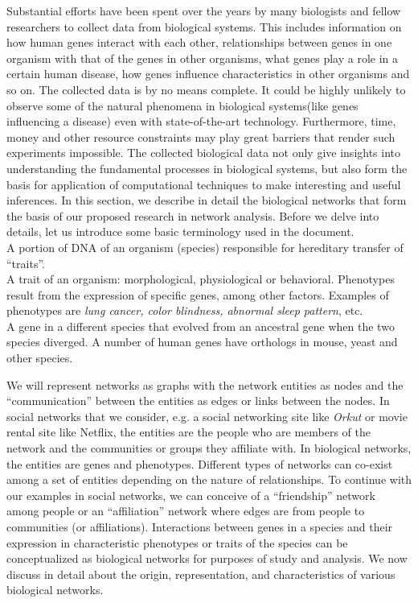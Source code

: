 Substantial efforts have been spent over the years by many biologists and fellow researchers to collect data from biological systems. This includes information on how human genes interact with each other, relationships between genes in one organism with that of the genes in other organisms, what genes play a role in a certain human disease, how genes influence characteristics in other organisms and so on. The collected data is by no means complete. It could be highly unlikely to observe some of the natural phenomena in biological systems(like genes influencing a disease) even with state-of-the-art technology. Furthermore, time, money and other resource constraints may play great barriers that render such experiments impossible. The collected biological data not only give insights into understanding the fundamental processes in biological systems, but also form the basis for application of computational techniques to make interesting and useful inferences. In this section, we describe in detail the biological networks that form the basis of our proposed research in network analysis. Before we delve into details, let us introduce some basic terminology used in the document.\\
 A portion of DNA of an organism (species) responsible for hereditary transfer of ``traits''.\\
 A trait of an organism: morphological, physiological or behavioral. Phenotypes result from the expression of specific genes, among other factors. Examples of phenotypes are \emph{lung cancer, color blindness, abnormal sleep pattern}, etc.\\
 A gene in a different species that evolved from an ancestral gene when the two species diverged.  A number of human genes have orthologs in mouse, yeast and other species.

We will represent networks as graphs with the network entities as nodes and the ``communication'' between the entities as edges or links between the nodes. In social networks that we consider, e.g. a social networking site like \emph{Orkut} or movie rental site like Netflix, the entities are the people who are members of the network and the communities or groups they affiliate with. In biological networks, the entities are genes and phenotypes. Different types of networks can co-exist among a set of entities depending on the nature of relationships. To continue with our examples in social networks, we can conceive of a ``friendship'' network among people or an ``affiliation'' network where edges are from people to communities (or affiliations). Interactions between genes in a species and their expression in characteristic phenotypes or traits of the species can be conceptualized as biological networks for purposes of study and analysis. We now discuss in detail about the origin, representation, and characteristics of various biological networks.

